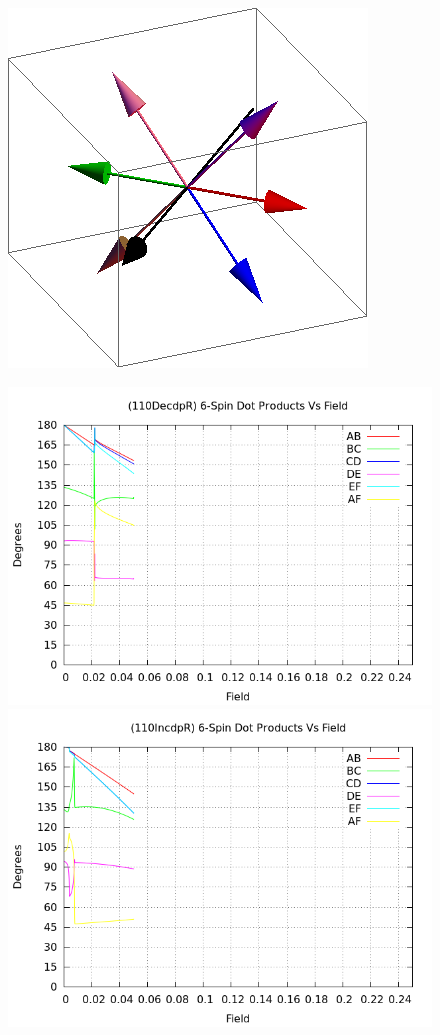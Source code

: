 \documentclass{article}
\begin{document}
\begin{figure}[ht]
\includegraphics[scale=0.23]{110/501S005to000R.png}
\caption{}
\end{figure}
\clearpage

\begin{figure}[ht]
\centering
\includegraphics[scale=0.5]{HVariedData/Pictures/110DecdpR.png}
\includegraphics[scale=0.5]{HVariedData/Pictures/110IncdpR.png}
\caption{}
\end{figure}
\clearpage
\end{document}
